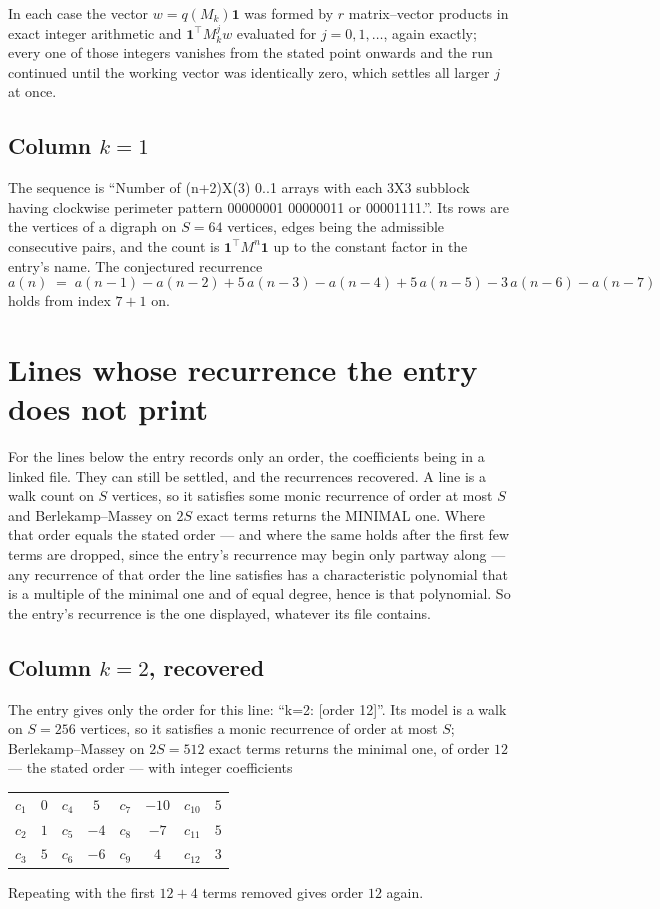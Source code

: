 \documentclass[11pt,a4paper]{article}
\theoremstyle{plain}
\theoremstyle{definition}
\begin{document}
In each case the vector $w=q(M_k)\mathbf{1}$ was formed by $r$ matrix--vector products in
exact integer arithmetic and $\mathbf{1}^{\!\top}M_k^{j}w$ evaluated for $j=0,1,\dots$,
again exactly; every one of those integers vanishes from the stated point onwards and the run
continued until the working vector was identically zero, which settles all larger $j$ at once.

\subsection*{Column $k$$=1$}
The sequence is ``Number of (n+2)X(3) 0..1 arrays with each 3X3 subblock having clockwise perimeter pattern 00000001 00000011 or 00001111.''. Its rows are the vertices of a digraph on
$S=64$ vertices, edges being the admissible consecutive pairs, and the count is
$\mathbf{1}^{\!\top}M^{n}\mathbf{1}$ up to the constant factor in the entry's name.
The conjectured recurrence
\[
a(n)\;=\;a(n-1) - a(n-2) + 5\,a(n-3) - a(n-4) + 5\,a(n-5) - 3\,a(n-6) - a(n-7)
\]
holds from index $7+1$ on.


\section{Lines whose recurrence the entry does not print}

For the lines below the entry records only an order, the coefficients being in a linked file.
They can still be settled, and the recurrences recovered. A line is a walk count on $S$
vertices, so it satisfies some monic recurrence of order at most $S$ and Berlekamp--Massey on
$2S$ exact terms returns the MINIMAL one. Where that order equals the stated order --- and
where the same holds after the first few terms are dropped, since the entry's recurrence may
begin only partway along --- any recurrence of that order the line satisfies has a
characteristic polynomial that is a multiple of the minimal one and of equal degree, hence is
that polynomial. So the entry's recurrence is the one displayed, whatever its file contains.

\subsection*{Column $k=2$, recovered}
The entry gives only the order for this line: ``k=2: [order 12]''. Its model is a walk on
$S=256$ vertices, so it satisfies a monic recurrence of order at most $S$;
Berlekamp--Massey on $2S=512$ exact terms returns the minimal one, of order
$12$ --- the stated order --- with integer coefficients
\begin{center}\small\begin{tabular}{cccccccc}
$c_{1}$ & $0$ & $c_{4}$ & $5$ & $c_{7}$ & $-10$ & $c_{10}$ & $5$ \\
$c_{2}$ & $1$ & $c_{5}$ & $-4$ & $c_{8}$ & $-7$ & $c_{11}$ & $5$ \\
$c_{3}$ & $5$ & $c_{6}$ & $-6$ & $c_{9}$ & $4$ & $c_{12}$ & $3$ \\
\end{tabular}\end{center}
Repeating with the first $12+4$ terms removed gives order $12$ again.
\end{document}
